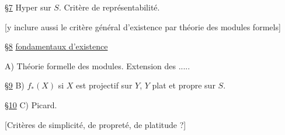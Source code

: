 
\uline{\S7} Hyper sur $S$. Critère de représentabilité.

[y inclure aussi le critère général d'existence par théorie des modules formels]

\uline{\S8}   \uline{fondamentaux d'existence}

A) Théorie formelle des modules. Extension des .....

\uline{\S9} B)  $f_*(X)$ si $X$ est projectif sur $Y$, $Y$ plat et propre sur $S$.

\uline{\S10} C) Picard.


[Critères de simplicité, de propreté, de platitude ?]

